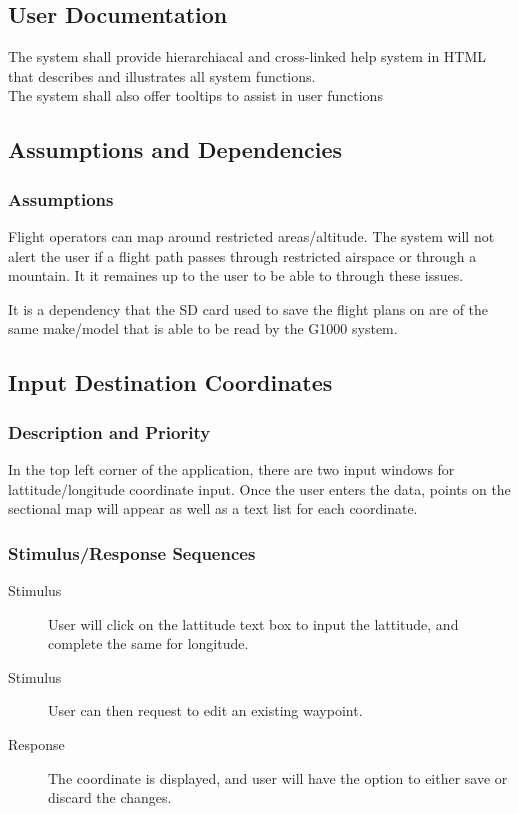 \documentclass[12pt, letterpaper]{article}
\begin{document}
  \subsection{User Documentation}
      The system shall provide hierarchiacal and cross-linked help system in HTML that
              describes and illustrates all system functions.\\
      The system shall also offer tooltips to assist in user functions \\
  \subsection{Assumptions and Dependencies}
      \subsubsection{Assumptions}
       Flight operators can map around restricted areas/altitude.
       The system will not alert the user if a flight path passes through restricted airspace or through a mountain.
       It it remaines up to the user to be able to through these issues.

       It is a dependency that the SD card used to save the flight plans on are of the same make/model that
       is able to be read by the G1000 system.

    \newpage

    \subsection{Input Destination Coordinates}

      \subsubsection{Description and Priority}
  		In the top left corner of the application, there are two input windows for
  		lattitude/longitude coordinate input. Once the user enters the data,
  		points on the sectional map will appear as well as a text list for each
  		coordinate.
      \subsubsection{Stimulus/Response Sequences}
        \begin{description}
          \item[Stimulus] User will click on the lattitude text box to input the
  			lattitude, and complete the same for longitude.
  		\item[Stimulus] User can then request to edit an existing waypoint.
  		\item[Response] The coordinate is displayed, and user will have the option to
  			either save or discard the changes.
        \end{description}
\end{document}
